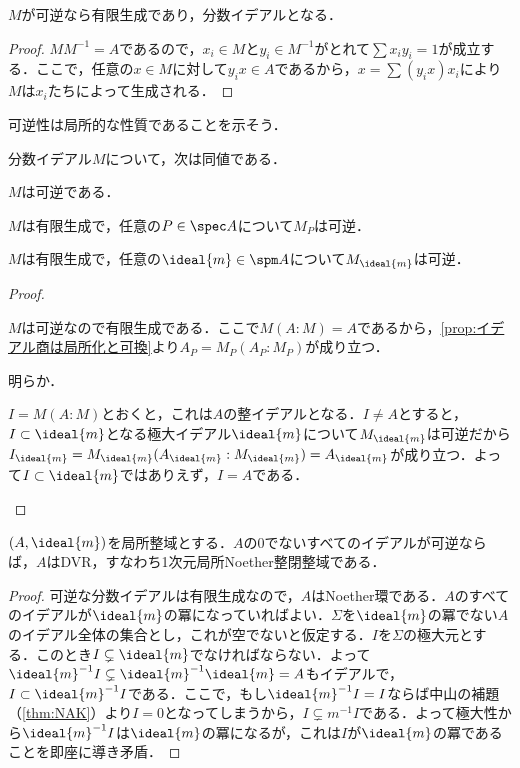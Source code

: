 \begin{lem}
	$M$が可逆なら有限生成であり，分数イデアルとなる．
\end{lem}

\begin{proof}
	 $MM^{-1}=A$であるので，$x_i\in M$と$y_i\in M^{-1}$がとれて$\sum x_iy_i=1$が成立する．ここで，任意の$x\in M$に対して$y_ix\in A$であるから，$x=\sum(y_ix)x_i$により$M$は$x_i$たちによって生成される．
\end{proof}

可逆性は局所的な性質であることを示そう．
	
\begin{prop}\label{prop:可逆性は局所的}
	分数イデアル$M$について，次は同値である．
	\begin{sakura}
		\item $M$は可逆である．
		\item $M$は有限生成で，任意の$P\in\spec A$について$M_P$は可逆．
		\item $M$は有限生成で，任意の$\ideal{m}\in\spm A$について$M_{\ideal{m}}$は可逆．
	\end{sakura}
\end{prop}

\begin{proof}
	\begin{eqv}[3]
		\item $M$は可逆なので有限生成である．ここで$M(A:M)=A$であるから，\ref{prop:イデアル商は局所化と可換}より$A_P=M_P(A_P:M_P)$が成り立つ．
		\item 明らか．
		\item $I=M(A:M)$とおくと，これは$A$の整イデアルとなる．$I\neq A$とすると，$I\subset \ideal{m}$となる極大イデアル$\ideal{m}$について$M_{\ideal{m}}$は可逆だから$I_{\ideal{m}}=M_{\ideal{m}}(A_{\ideal{m}}:M_{\ideal{m}})=A_{\ideal{m}}$が成り立つ．よって$I\subset\ideal{m}$ではありえず，$I=A$である．
	\end{eqv}
\end{proof}

\begin{lem}\label{lem:局所の場合の可逆性}
	$(A,\ideal{m})$を局所整域とする．$A$の0でないすべてのイデアルが可逆ならば，$A$はDVR，すなわち1次元局所Noether整閉整域である．
\end{lem}

\begin{proof}
	可逆な分数イデアルは有限生成なので，$A$はNoether環である．$A$のすべてのイデアルが$\ideal{m}$の冪になっていればよい．$\Sigma$を$\ideal{m}$の冪でない$A$のイデアル全体の集合とし，これが空でないと仮定する．$I$を$\Sigma$の極大元とする．このとき$I\subsetneq\ideal{m}$でなければならない．よって$\ideal{m}^{-1}I\subsetneq \ideal{m}^{-1}\ideal{m}=A$もイデアルで，$I\subset \ideal{m}^{-1}I$である．ここで，もし$\ideal{m}^{-1}I=I$ならば中山の補題（\ref{thm:NAK}）より$I=0$となってしまうから，$I\subsetneq m^{-1}I$である．よって極大性から$\ideal{m}^{-1}I$は$\ideal{m}$の冪になるが，これは$I$が$\ideal{m}$の冪であることを即座に導き矛盾．
\end{proof}

